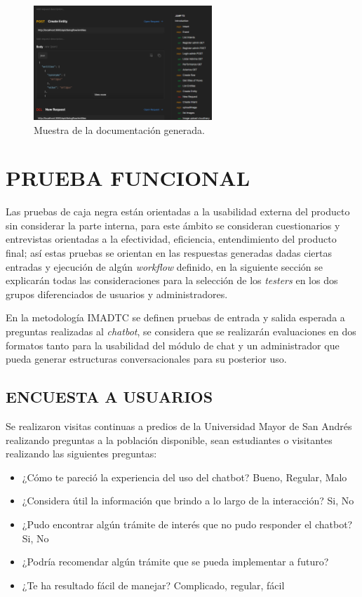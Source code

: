 \documentclass[letter, openright, 12pt]{book}
\begin{document}
{\begin{figure}[H]
\centering
\includegraphics[width=0.6\textwidth]{figura4_2}
\caption{Muestra de la documentación generada.  }
\label{fig:figura4_2}
\end{figure}

\section{PRUEBA FUNCIONAL}
Las pruebas de caja negra están orientadas a la usabilidad externa del producto sin considerar la parte interna, para este ámbito se consideran cuestionarios y entrevistas orientadas a la efectividad, eficiencia, entendimiento del producto final; así estas pruebas se orientan en las respuestas generadas dadas ciertas entradas y ejecución de algún \textit{workflow} definido, en la siguiente sección se explicarán todas las consideraciones para la selección de los \textit{testers} en los dos grupos diferenciados de usuarios y administradores.

\par 
En la metodología IMADTC se definen pruebas de entrada y salida esperada a preguntas realizadas al \textit{chatbot}, se considera que se realizarán evaluaciones en dos formatos tanto para la usabilidad del módulo de chat y un administrador que pueda generar estructuras conversacionales para su posterior uso. 

\subsection{ENCUESTA A USUARIOS}
Se realizaron visitas continuas a predios de la Universidad Mayor de San Andrés realizando preguntas a la población disponible, sean estudiantes o visitantes realizando las siguientes preguntas:

\begin{itemize}
\item ¿Cómo te pareció la experiencia del uso del chatbot? Bueno, Regular, Malo
\item ¿Considera útil la información que brindo a lo largo de la interacción? Si, No
\item ¿Pudo encontrar algún trámite de interés que no pudo responder el chatbot? Si, No
\item ¿Podría recomendar algún trámite que se pueda implementar a futuro?
\item ¿Te ha resultado fácil de manejar? Complicado, regular, fácil
\end{itemize}


}
\end{document}
